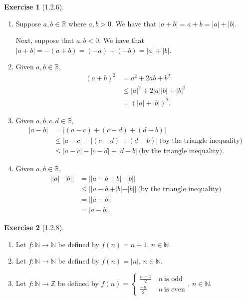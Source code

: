 \documentclass{amsart}
\theoremstyle{definition}
\newtheorem{exercise}{Exercise}
\newcommand{\N}{\mathbb{N}}
\newcommand{\Z}{\mathbb{Z}}
\newcommand{\R}{\mathbb{R}}
\newcommand{\abs}[1]{|#1|}
\begin{document}
\begin{exercise}[1.2.6]
  \begin{enumerate}[label={(\alph*)}]
    \item Suppose $a, b \in \R$ where $a, b > 0$. We have that $\abs{a + b} = a
      + b = \abs{a} + \abs{b}$.

      Next, suppose that $a, b < 0$. We have that $\abs{a + b} = -(a + b) = (-a)
      + (-b) = \abs{a} + \abs{b}$.
    \item Given $a, b \in \R$,
      \begin{align*}
        {(a + b)}^2 &= a^2 + 2ab + b^2 \\
        &\le \abs{a}^2 + 2\abs{a}\abs{b} + \abs{b}^2 \\
        &= {(\abs{a} + \abs{b})}^2.
      \end{align*}
    \item Given $a, b, c, d \in \R$,
      \begin{align*}
        \abs{a - b} &= \abs{(a - c) + (c - d) + (d - b)} \\
        &\le \abs{a - c} + \abs{(c - d) + (d - b)}\ \text{(by the triangle
        inequality)} \\
        &\le \abs{a - c} + \abs{c - d} + \abs{d - b}\ \text{(by the triangle
        inequality)}.
      \end{align*}
    \item Given $a, b \in \R$,
      \begin{align*}
        \abs{\abs{a} - \abs{b}} &= \abs{\abs{a - b + b} - \abs{b}} \\
        &\le \abs{\abs{a - b} + \abs{b} - \abs{b}}\ \text{(by the triangle
        inequality)} \\
        &= \abs{\abs{a - b}} \\
        &= \abs{a - b}.
      \end{align*}
  \end{enumerate}
\end{exercise}

\begin{exercise}[1.2.8]
  \begin{enumerate}[label={(\alph*)}]
    \item Let $f : \N \rightarrow \N$ be defined by $f(n) = n + 1$, $n \in \N$.
    \item Let $f : \N \rightarrow \N$ be defined by $f(n) = \abs{n}$, $n \in \N$.
    \item Let $f : \N \rightarrow \Z$ be defined by $f(n) =
      \begin{cases}
        \frac{n - 1}{2} &\, n\ \text{is odd} \\
        \frac{-n}{2} &\, n\ \text{is even}
      \end{cases}$,
      $n \in \N$.
  \end{enumerate}
\end{exercise}
\end{document}
